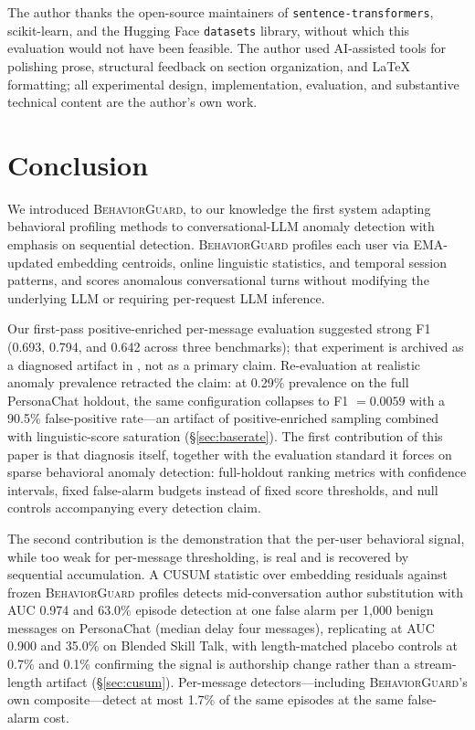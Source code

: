 \documentclass[conference]{IEEEtran}
\newcommand{\BG}{\textsc{BehaviorGuard}}
\begin{document}
The author thanks the open-source maintainers of \texttt{sentence-transformers},
scikit-learn, and the Hugging Face \texttt{datasets} library, without which this
evaluation would not have been feasible.
The author used AI-assisted tools for polishing prose, structural feedback on section
organization, and \LaTeX{} formatting; all experimental design, implementation,
evaluation, and substantive technical content are the author's own work.

\section{Conclusion}
\label{sec:conclusion}

We introduced \BG{}, to our knowledge the first system adapting behavioral profiling
methods to conversational-LLM anomaly detection with emphasis on sequential
detection.
\BG{} profiles each user via EMA-updated embedding centroids, online linguistic
statistics, and temporal session patterns, and scores anomalous conversational turns
without modifying the underlying LLM or requiring per-request LLM inference.

Our first-pass positive-enriched per-message evaluation suggested strong F1
(0.693, 0.794, and 0.642 across three benchmarks); that experiment is archived as a
diagnosed artifact in , not as a primary claim.
Re-evaluation at realistic anomaly prevalence retracted the claim: at 0.29\%
prevalence on the full PersonaChat holdout, the same configuration collapses to
F1 $= 0.0059$ with a 90.5\% false-positive rate---an artifact of positive-enriched
sampling combined with linguistic-score saturation (\S\ref{sec:baserate}).
The first contribution of this paper is that diagnosis itself, together with the
evaluation standard it forces on sparse behavioral anomaly detection: full-holdout
ranking metrics with confidence intervals, fixed false-alarm budgets instead of
fixed score thresholds, and null controls accompanying every detection claim.

The second contribution is the demonstration that the per-user behavioral signal,
while too weak for per-message thresholding, is real and is recovered by sequential
accumulation.
A CUSUM statistic over embedding residuals against frozen \BG{} profiles detects
mid-conversation author substitution with AUC 0.974 and 63.0\% episode detection at
one false alarm per 1{,}000 benign messages on PersonaChat (median delay four
messages), replicating at AUC 0.900 and 35.0\% on Blended Skill Talk, with
length-matched placebo controls at 0.7\% and 0.1\% confirming the signal is
authorship change rather than a stream-length artifact (\S\ref{sec:cusum}).
Per-message detectors---including \BG{}'s own composite---detect at most 1.7\% of
the same episodes at the same false-alarm cost.
\end{document}
